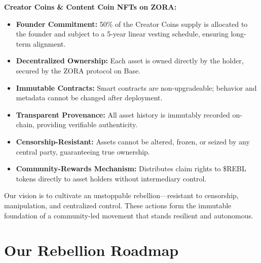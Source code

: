 \documentclass{article}
\begin{document}
\begin{tcolorbox}[colback=headerColor!10!white, colframe=headerColor, boxrule=2pt, width=\textwidth, arc=6mm, left=8mm, right=8mm, top=6mm, bottom=6mm]
\noindent
\textbf{Creator Coins \& Content Coin NFTs on ZORA:}
\begin{itemize}
    \item \textbf{Founder Commitment:} 50\% of the Creator Coins supply is allocated to the founder and subject to a 5-year linear vesting schedule, ensuring long-term alignment.
    \item \textbf{Decentralized Ownership:} Each asset is owned directly by the holder, secured by the ZORA protocol on Base.
    \item \textbf{Immutable Contracts:} Smart contracts are non-upgradeable; behavior and metadata cannot be changed after deployment.
    \item \textbf{Transparent Provenance:} All asset history is immutably recorded on-chain, providing verifiable authenticity.
    \item \textbf{Censorship-Resistant:} Assets cannot be altered, frozen, or seized by any central party, guaranteeing true ownership.
    \item \textbf{Community-Rewards Mechanism:} Distributes claim rights to \$REBL tokens directly to asset holders without intermediary control.
\end{itemize}

Our vision is to cultivate an unstoppable rebellion—resistant to censorship, manipulation, and centralized control. These actions form the immutable foundation of a community-led movement that stands resilient and autonomous.
\end{tcolorbox}


\vspace{1em}
\section[
\texorpdfstring{\color{primaryColor}Our Rebellion Roadmap}{Our Rebellion Roadmap}
]{\color{primaryColor}\textbf{Our Rebellion Roadmap}}
\end{document}
